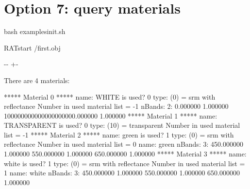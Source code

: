 \documentclass[letterpaper,10pt,english]{sphinxmanual}
\newlength\nbsphinxcodecellspacing
\begin{document}
\section{Option 7: query materials}
\label{\detokenize{RATstartOptions:Option-7:-query-materials}}
\begin{sphinxVerbatim}[commandchars=\\\{\}]
                       
\end{sphinxVerbatim}

{
\begin{sphinxVerbatim}[commandchars=\\\{\}]
\llap{\color{nbsphinxin}[13]:\,\hspace{\fboxrule}\hspace{\fboxsep}}\PYGZpc{}\PYGZpc{}bash
 examples\PYGZus{}init.sh

RATstart /first.obj  
\end{sphinxVerbatim}
}

{

\kern-\sphinxverbatimsmallskipamount\kern-\baselineskip
\kern+\FrameHeightAdjust\kern-\fboxrule
\vspace{\nbsphinxcodecellspacing}

\begin{sphinxVerbatim}[commandchars=\\\{\}]
There are 4 materials:

***** Material 0 *****
        name: WHITE     is used? 0
        type: (0) = srm with reflectance
        Number in used material list = -1
        nBands: 2:
0.000000 1.000000
100000000000000000000.000000 1.000000
***** Material 1 *****
        name: TRANSPARENT       is used? 0
        type: (10) = transparent
        Number in used material list = -1
***** Material 2 *****
        name: green     is used? 1
        type: (0) = srm with reflectance
        Number in used material list = 0        name: green
        nBands: 3:
450.000000 1.000000
550.000000 1.000000
650.000000 1.000000
***** Material 3 *****
        name: white     is used? 1
        type: (0) = srm with reflectance
        Number in used material list = 1        name: white
        nBands: 3:
450.000000 1.000000
550.000000 1.000000
650.000000 1.000000
\end{sphinxVerbatim}
}
\end{document}
